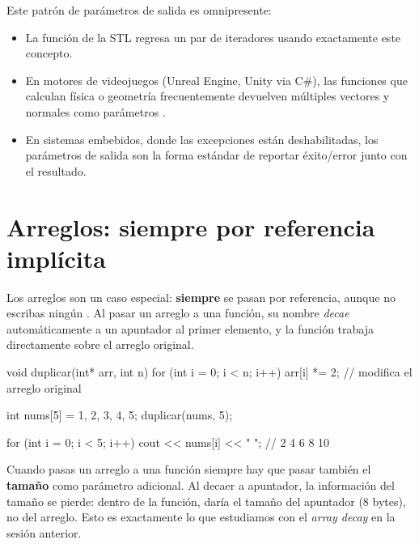 \documentclass[12pt, oneside]{article}
\begin{document}
\begin{tecnico}
  Este patrón de parámetros de salida es omnipresente:
  \begin{itemize}
    \item La función  de la STL regresa un par de
          iteradores usando exactamente este concepto.
    \item En motores de videojuegos (Unreal Engine, Unity via C\#), las funciones
          que calculan física o geometría frecuentemente devuelven múltiples
          vectores y normales como parámetros .
    \item En sistemas embebidos, donde las excepciones están deshabilitadas,
          los parámetros de salida son la forma estándar de reportar éxito/error
          junto con el resultado.
  \end{itemize}
\end{tecnico}

\section{Arreglos: siempre por referencia implícita}

Los arreglos son un caso especial: \textbf{siempre} se pasan por referencia,
aunque no escribas ningún \cpp{\&}. Al pasar un arreglo a una función, su nombre
\textit{decae} automáticamente a un apuntador al primer elemento, y la función
trabaja directamente sobre el arreglo original.

\begin{codigo}[caption={Arreglos: la función modifica el original}]
void duplicar(int* arr, int n) {
    for (int i = 0; i < n; i++)
        arr[i] *= 2;   // modifica el arreglo original
}

int nums[5] = {1, 2, 3, 4, 5};
duplicar(nums, 5);

for (int i = 0; i < 5; i++)
    cout << nums[i] << " ";   // 2 4 6 8 10
\end{codigo}

\begin{recuerda}
  Cuando pasas un arreglo a una función siempre hay que pasar también
  el \textbf{tamaño} como parámetro adicional. Al decaer a apuntador,
  la información del tamaño se pierde: dentro de la función,
   daría el tamaño del apuntador (8 bytes), no del arreglo.
  Esto es exactamente lo que estudiamos con el \textit{array decay} en la
  sesión anterior.
\end{recuerda}
\end{document}
